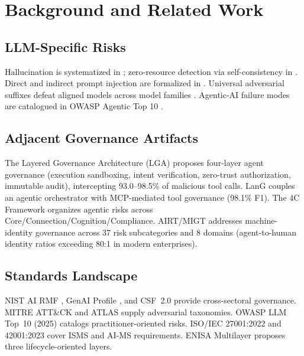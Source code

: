 \documentclass[journal]{IEEEtran}
\begin{document}
\section{Background and Related Work}
\label{sec:background}

\subsection{LLM-Specific Risks}
Hallucination is systematized in \cite{ji2023hallucination}; zero-resource detection via
self-consistency in \cite{manakul2023selfcheckgpt}. Direct and indirect prompt injection are
formalized in \cite{liu2024formalizing,greshake2023indirect}. Universal adversarial suffixes
defeat aligned models across model families \cite{zou2023universal}. Agentic-AI failure modes
are catalogued in OWASP Agentic Top 10 \cite{owasp2025agentic,owasp2025agenticthreats}.

\subsection{Adjacent Governance Artifacts}
The Layered Governance Architecture (LGA) \cite{lga2026} proposes four-layer agent governance
(execution sandboxing, intent verification, zero-trust authorization, immutable audit),
intercepting 93.0--98.5\% of malicious tool calls. LanG \cite{lang2026} couples an agentic
orchestrator with MCP-mediated tool governance (98.1\% F1). The 4C Framework \cite{4c2026}
organizes agentic risks across Core/Connection/Cognition/Compliance. AIRT/MIGT \cite{airt_migt2026}
addresses machine-identity governance across 37 risk subcategories and 8 domains
(agent-to-human identity ratios exceeding 80:1 in modern enterprises).

\subsection{Standards Landscape}
NIST AI RMF \cite{nist2023airmf}, GenAI Profile \cite{nist2024genai}, and CSF~2.0
\cite{nist2024csf} provide cross-sectoral governance. MITRE ATT\&CK \cite{mitre2024attck}
and ATLAS \cite{mitre2025atlas} supply adversarial taxonomies. OWASP LLM Top~10 (2025)
\cite{owasp2025llm} catalogs practitioner-oriented risks. ISO/IEC 27001:2022 \cite{iso27001}
and 42001:2023 \cite{iso42001} cover ISMS and AI-MS requirements. ENISA Multilayer
\cite{enisa2023multilayer} proposes three lifecycle-oriented layers.
\end{document}
